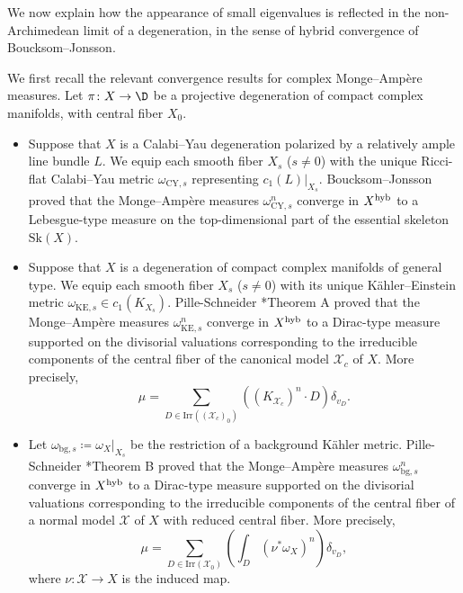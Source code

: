 \documentclass[12pt]{amsart}
\begin{document}
We now explain how the appearance of {small eigenvalues} is
reflected in the non-Archimedean limit of a degeneration, in the sense
of hybrid convergence of Boucksom--Jonsson.

We first recall the relevant convergence results for complex
Monge--Amp\`ere measures. Let
$\pi\colon X \to \D$ be a projective degeneration of compact complex
manifolds, with central fiber $X_0$.
\begin{itemize}
    \item 
    Suppose that $X$ is a Calabi--Yau degeneration polarized by a
    relatively ample line bundle $L$. We equip each smooth fiber $X_s$
    ($s \neq 0$) with the unique Ricci-flat Calabi--Yau metric
    $\omega_{\mathrm{CY},s}$ representing
    $c_1(L)|_{X_s}$. Boucksom--Jonsson
    \cite{Boucksom-Jonsson2017} proved that the Monge--Amp\`ere
    measures $\omega_{\mathrm{CY},s}^n$ converge in $X^{\rm hyb}$ to a
    Lebesgue-type measure on the top-dimensional part of the essential
    skeleton $\mathrm{Sk}(X)$.

    \item
    Suppose that $X$ is a degeneration of compact complex manifolds of
    general type. We equip each smooth fiber $X_s$ ($s \neq 0$) with
    its unique K\"ahler--Einstein metric
    $\omega_{\mathrm{KE},s} \in c_1(K_{X_s})$. Pille-Schneider
    \cite{PilleSchneider2022}*{Theorem A} proved that the
    Monge--Amp\`ere measures $\omega_{\mathrm{KE},s}^n$ converge in
    $X^{\rm hyb}$ to a Dirac-type measure supported on the divisorial
    valuations corresponding to the irreducible components of the 
    central
    fiber of the canonical model $\mathcal{X}_c$ of $X$. More precisely,
    \[
        \mu =
        \sum_{D \in \mathrm{Irr}((\mathcal{X}_c)_0)}
        ((K_{\mathcal{X}_c})^n \cdot D)\delta_{v_D}.
    \]

    \item
    Let $\omega_{\mathrm{bg},s} \coloneqq \omega_X|_{X_s}$ be the
    restriction of a background K\"ahler metric. Pille-Schneider
    \cite{PilleSchneider2022}*{Theorem B} proved that the
    Monge--Amp\`ere measures $\omega_{\mathrm{bg},s}^n$ converge in
    $X^{\rm hyb}$ to a Dirac-type measure supported on the divisorial
    valuations corresponding to the irreducible components of 
    the central
    fiber of a normal model $\mathcal{X}$ of $X$ with reduced central
    fiber. More precisely,
    \[
        \mu =
        \sum_{D \in \mathrm{Irr}(\mathcal{X}_0)}
        \left(\int_D(\nu^*\omega_X)^n\right)\delta_{v_D},
    \]
    where $\nu\colon \mathcal{X}\to X$ is the induced map.
\end{itemize}
\end{document}
